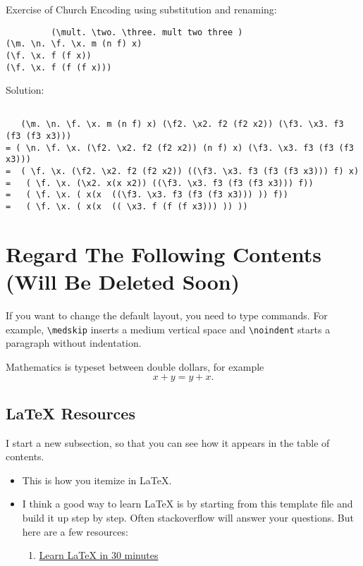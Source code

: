 \documentclass{article}
\begin{document}
Exercise of Church Encoding using substitution and renaming:
\begin{lstlisting}
         (\mult. \two. \three. mult two three )
(\m. \n. \f. \x. m (n f) x)  
(\f. \x. f (f x))
(\f. \x. f (f (f x)))
  \end{lstlisting}
Solution: 
\begin{lstlisting}
    
   (\m. \n. \f. \x. m (n f) x) (\f2. \x2. f2 (f2 x2)) (\f3. \x3. f3 (f3 (f3 x3)))    
= ( \n. \f. \x. (\f2. \x2. f2 (f2 x2)) (n f) x) (\f3. \x3. f3 (f3 (f3 x3)))  
=  ( \f. \x. (\f2. \x2. f2 (f2 x2)) ((\f3. \x3. f3 (f3 (f3 x3))) f) x)
=   ( \f. \x. (\x2. x(x x2)) ((\f3. \x3. f3 (f3 (f3 x3))) f))
=   ( \f. \x. ( x(x  ((\f3. \x3. f3 (f3 (f3 x3))) )) f))
=   ( \f. \x. ( x(x  (( \x3. f (f (f x3))) )) ))

  \end{lstlisting}







\section{Regard The Following Contents (Will Be Deleted Soon)}

\medskip\noindent
If you want to change the default layout, you need to type commands. For example, \verb+\medskip+ inserts a medium vertical space and \verb+\noindent+ starts a paragraph without indentation.
 
\medskip\noindent
Mathematics is typeset between double dollars, for example $$x+y=y+x.$$


\subsection{LaTeX Resources}

I start a new subsection, so that you can see how it appears in the table of contents.

\begin{itemize}
\item This is how you itemize in LaTeX.
\item I think a good way to learn LaTeX is by starting from this template file and build it up step by step. Often stackoverflow will answer your questions. But here are a few resources:
  \begin{enumerate}
  \item \href{https://www.overleaf.com/learn/latex/Learn_LaTeX_in_30_minutes}{Learn LaTeX in 30 minutes}
  \end{enumerate}
\end{itemize}
\end{document}

